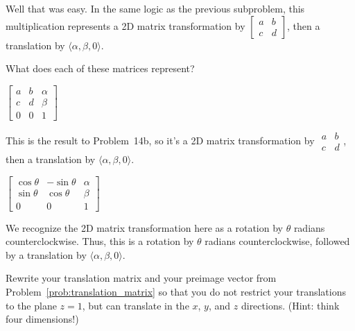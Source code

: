 \documentclass[../key.tex]{subfiles}
\begin{document}
Well that was easy. In the same logic as the previous subproblem, this multiplication represents a 2D matrix transformation by $\left[\begin{smallmatrix} a & b \\ c & d \end{smallmatrix}\right]$, then a translation by $\langle \alpha, \beta, 0\rangle$.

\begin{outer_problem}
\item What does each of these matrices represent?
\end{outer_problem}

\begin{inner_problem}[start=1]
\item $\left[\begin{array}{ccc} a & b & \alpha \\ c & d & \beta \\ 0 & 0 & 1 \end{array}\right]$
\end{inner_problem}

This is the result to Problem~14b, so it's a 2D matrix transformation by $\begin{smallmatrix} a & b \\ c & d \end{smallmatrix}$, then a translation by $\langle \alpha, \beta, 0\rangle$.

\begin{inner_problem}
\item $\left[\begin{array}{ccc} \cos\theta & -\sin\theta & \alpha \\ \sin\theta & \cos\theta & \beta \\ 0 & 0 & 1 \end{array}\right]$
\end{inner_problem}

We recognize the 2D matrix transformation here as a rotation by $\theta$ radians counterclockwise. Thus, this is a rotation by $\theta$ radians counterclockwise, followed by a translation by $\langle \alpha, \beta, 0\rangle$.

\begin{outer_problem}
\item
\end{outer_problem}

\begin{inner_problem}[start=1]
\item Rewrite your translation matrix and your preimage vector from Problem~\ref{prob:translation_matrix} so that you do not restrict your translations to the plane $z=1$, but can translate in the $x$, $y$, and $z$ directions. (Hint: think four dimensions!)
\end{inner_problem}
\end{document}
